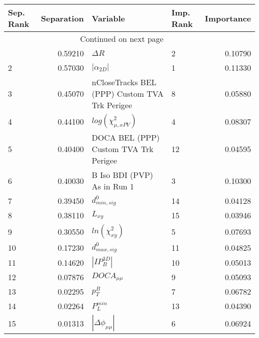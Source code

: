 \usepackage{lscape}

\begin{landscape}
\begin{longtable}{lrllr}
\toprule
Sep. Rank &  Separation &                                       Variable & Imp. Rank &  Importance \\
\midrule
\endhead
\midrule
\multicolumn{3}{r}{{Continued on next page}} \\
\midrule
\endfoot

\bottomrule
\endlastfoot
        1 &     0.59210 &                                     $\Delta R$ &         2 &     0.10790 \\
        2 &     0.57030 &                                $|\alpha_{2D}|$ &         1 &     0.11330 \\
        3 &     0.45070 &  nCloseTracks BEL (PPP) Custom TVA Trk Perigee &         8 &     0.05880 \\
        4 &     0.44100 &                      $log(\chi^{2}_{\mu,xPV})$ &         4 &     0.08307 \\
        5 &     0.40400 &          DOCA BEL (PPP) Custom TVA Trk Perigee &        12 &     0.04595 \\
        6 &     0.40030 &                    B Iso BDI (PVP) As in Run 1 &         3 &     0.10300 \\
        7 &     0.39450 &                               $d^0_{min, sig}$ &        14 &     0.04128 \\
        8 &     0.38110 &                                       $L_{xy}$ &        15 &     0.03946 \\
        9 &     0.30550 &                            $ln(\chi^{2}_{xy})$ &         5 &     0.07693 \\
       10 &     0.17230 &                               $d^0_{max, sig}$ &        11 &     0.04825 \\
       11 &     0.14620 &                                $|IP_{B}^{3D}|$ &        10 &     0.05013 \\
       12 &     0.07876 &                                $DOCA_{\mu\mu}$ &         9 &     0.05093 \\
       13 &     0.02295 &                                      $p^B_{T}$ &         7 &     0.06782 \\
       14 &     0.02264 &                                  $P^{min}_{L}$ &        13 &     0.04390 \\
       15 &     0.01313 &                       $|\Delta \phi_{\mu\mu}|$ &         6 &     0.06924 \\
\end{longtable}

\end{landscape}
